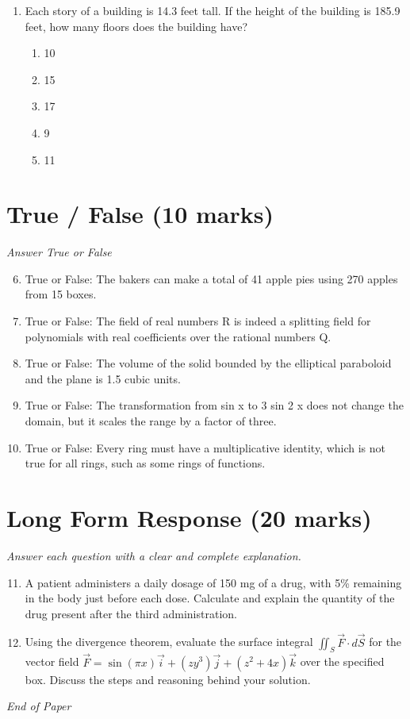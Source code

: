 \documentclass[12pt]{article}
\begin{document}
\begin{enumerate}[label=\arabic*.]
\begin{enumerate}[label=(\alph*)]
    \item 0,1,2,3
    \item 1
    \item 3,4
    \item 0,1,2
\end{enumerate}
\item Each story of a building is 14.3 feet tall. If the height of the building is 185.9 feet, how many floors does the building have?
\begin{enumerate}[label=(\alph*)]
    \item 10
    \item 15
    \item 17
    \item 9
    \item 11
\end{enumerate}
\end{enumerate}

\section*{True / False (10 marks)}
\textit{Answer True or False}
\begin{enumerate}[label=\arabic*.]
\setcounter{enumi}{5}
\item True or False: The bakers can make a total of 41 apple pies using 270 apples from 15 boxes.
\item True or False: The field of real numbers R is indeed a splitting field for polynomials with real coefficients over the rational numbers Q.
\item True or False: The volume of the solid bounded by the elliptical paraboloid and the plane is 1.5 cubic units.
\item True or False: The transformation from sin x to 3 sin 2 x does not change the domain, but it scales the range by a factor of three.
\item True or False: Every ring must have a multiplicative identity, which is not true for all rings, such as some rings of functions.
\end{enumerate}

\section*{Long Form Response (20 marks)}
\textit{Answer each question with a clear and complete explanation.}
\begin{enumerate}[label=\arabic*.]
\setcounter{enumi}{10}
\item A patient administers a daily dosage of 150 mg of a drug, with 5\% remaining in the body just before each dose. Calculate and explain the quantity of the drug present after the third administration.
\item Using the divergence theorem, evaluate the surface integral $\iint_S \vec{F} \cdot d \vec{S}$ for the vector field $\vec{F} = \sin(\pi x) \vec{i} + (z y^3) \vec{j} + (z^2 + 4 x) \vec{k}$ over the specified box. Discuss the steps and reasoning behind your solution.
\end{enumerate}

\vfill
\noindent\textit{End of Paper}
\end{document}

